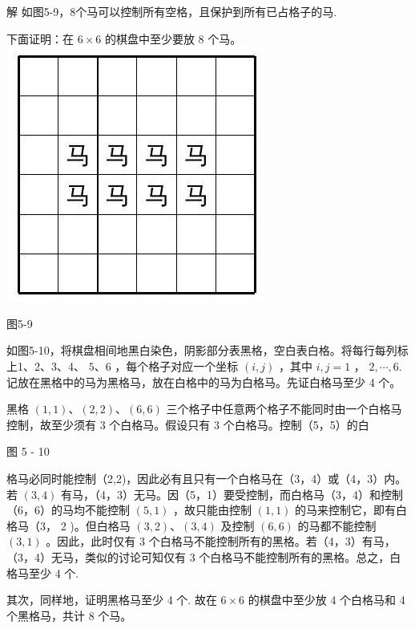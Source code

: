 \documentclass[10pt]{article}
\begin{document}
解 如图5-9，8个马可以控制所有空格，且保护到所有已占格子的马.

下面证明：在 $6 \times 6$ 的棋盘中至少要放 8 个马。\\
\includegraphics[max width=\textwidth, center]{2024_10_09_bce9f07034ef55fc9c97g-62}

图5-9

如图5-10，将棋盘相间地黑白染色，阴影部分表黑格，空白表白格。将每行每列标上1、2、3、4、 $5 、 6$ ，每个格子对应一个坐标 $(i, j)$ ，其中 $i, j=1$ ， $2, \cdots, 6$. 记放在黑格中的马为黑格马，放在白格中的马为白格马。先证白格马至少 4 个。

黑格 $(1,1) 、(2,2) 、(6,6)$ 三个格子中任意两个格子不能同时由一个白格马控制，故至少须有 3 个白格马。假设只有 3 个白格马。控制（5，5）的白

图 5 - 10

格马必同时能控制（2,2)，因此必有且只有一个白格马在（3，4）或（4，3）内。若 $(3,4)$ 有马，（4，3）无马。因（5，1）要受控制，而白格马（3，4）和控制（6，6）的马均不能控制 $(5,1)$ ，故只能由控制 $(1,1)$ 的马来控制它，即有白格马（3， 2 )。但白格马 $(3,2) 、(3,4)$ 及控制 $(6,6)$ 的马都不能控制 $(3,1)$ 。因此，此时仅有 3 个白格马不能控制所有的黑格。若（4，3）有马，（3，4）无马，类似的讨论可知仅有 3 个白格马不能控制所有的黑格。总之，白格马至少 4 个.

其次，同样地，证明黑格马至少 4 个. 故在 $6 \times 6$ 的棋盘中至少放 4 个白格马和 4 个黑格马，共计 8 个马。
\end{document}
